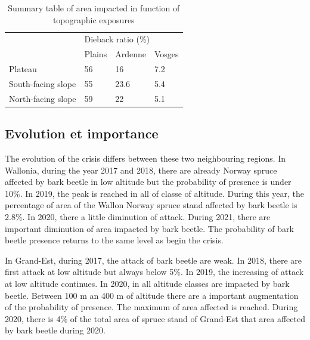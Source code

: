 \documentclass[3p,procedia]{elsarticle}
\begin{document}
\begin{table}[htbp] 
\caption{Summary table of area impacted in function of topographic exposures}
\label{tab_or_topo}

\begin{tabular}{|l|lll|}
\hline
\multirow{2}{*}{}  & \multicolumn{3}{l|}{Dieback ratio (\%)}                             \\ \cline{2-4} 
                   & \multicolumn{1}{l|}{Plains} & \multicolumn{1}{l|}{Ardenne} & Vosges \\ \hline
Plateau            & \multicolumn{1}{l|}{56}   & \multicolumn{1}{l|}{16}    & 7.2    \\ \hline
South-facing slope & \multicolumn{1}{l|}{55}   & \multicolumn{1}{l|}{23.6}    & 5.4    \\ \hline
North-facing slope & \multicolumn{1}{l|}{59}   & \multicolumn{1}{l|}{22}    & 5.1   \\ \hline
\end{tabular}
\end{table}

  



\iffalse\subsection{Evolution et importance}

The evolution of the crisis differs between these two neighbouring regions. 
In Wallonia, during the year 2017 and 2018, there are already Norway spruce affected by bark beetle in low altitude but the probability of presence is under 10\%. 
In 2019, the peak is reached in all of classe of altitude. During this year, the percentage of area of the Wallon Norway spruce stand affected by bark beetle is 2.8\%.
In 2020, there a  little diminution of attack. 
During 2021, there are important diminution of area impacted by bark beetle. The probability of bark beetle presence returns to the same level as begin the crisis.

In Grand-Est, during 2017, the attack of bark beetle are weak. 
In 2018, there are first attack at low altitude but always below 5\%.
In 2019, the increasing of attack at low altitude continues.
In 2020, in all altitude classes are impacted by bark beetle. 
Between 100 m an 400 m of altitude there are a important augmentation of the probability of presence. 
The maximum of area affected is reached. %
During 2020, there is 4\% of the total area of spruce stand of Grand-Est that area affected by bark beetle during 2020.
\end{document}
